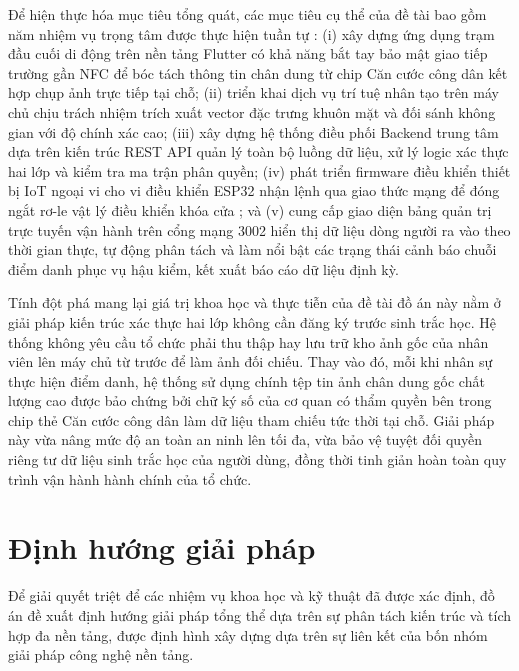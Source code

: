 \documentclass[../DoAn.tex]{subfiles}
\begin{document}
Để hiện thực hóa mục tiêu tổng quát, các mục tiêu cụ thể của đề tài bao gồm năm nhiệm vụ trọng tâm được thực hiện tuần tự : (i) xây dựng ứng dụng trạm đầu cuối di động trên nền tảng Flutter có khả năng bắt tay bảo mật giao tiếp trường gần NFC để bóc tách thông tin chân dung từ chip Căn cước công dân kết hợp chụp ảnh trực tiếp tại chỗ; (ii) triển khai dịch vụ trí tuệ nhân tạo trên máy chủ chịu trách nhiệm trích xuất vector đặc trưng khuôn mặt và đối sánh không gian với độ chính xác cao; (iii) xây dựng hệ thống điều phối Backend trung tâm dựa trên kiến trúc REST API quản lý toàn bộ luồng dữ liệu, xử lý logic xác thực hai lớp và kiểm tra ma trận phân quyền; (iv) phát triển firmware điều khiển thiết bị IoT ngoại vi cho vi điều khiển ESP32 nhận lệnh qua giao thức mạng để đóng ngắt rơ-le vật lý điều khiển khóa cửa ; và (v) cung cấp giao diện bảng quản trị trực tuyến vận hành trên cổng mạng 3002 hiển thị dữ liệu dòng người ra vào theo thời gian thực, tự động phân tách và làm nổi bật các trạng thái cảnh báo chuỗi điểm danh phục vụ hậu kiểm, kết xuất báo cáo dữ liệu định kỳ.

Tính đột phá mang lại giá trị khoa học và thực tiễn của đề tài đồ án này nằm ở giải pháp kiến trúc xác thực hai lớp không cần đăng ký trước sinh trắc học. Hệ thống không yêu cầu tổ chức phải thu thập hay lưu trữ kho ảnh gốc của nhân viên lên máy chủ từ trước để làm ảnh đối chiếu. Thay vào đó, mỗi khi nhân sự thực hiện điểm danh, hệ thống sử dụng chính tệp tin ảnh chân dung gốc chất lượng cao được bảo chứng bởi chữ ký số của cơ quan có thẩm quyền bên trong chip thẻ Căn cước công dân làm dữ liệu tham chiếu tức thời tại chỗ. Giải pháp này vừa nâng mức độ an toàn an ninh lên tối đa, vừa bảo vệ tuyệt đối quyền riêng tư dữ liệu sinh trắc học của người dùng, đồng thời tinh giản hoàn toàn quy trình vận hành hành chính của tổ chức.

\section{Định hướng giải pháp}
\label{section:1.3}

Để giải quyết triệt để các nhiệm vụ khoa học và kỹ thuật đã được xác định, đồ án đề xuất định hướng giải pháp tổng thể dựa trên sự phân tách kiến trúc và tích hợp đa nền tảng, được định hình xây dựng dựa trên sự liên kết của bốn nhóm giải pháp công nghệ nền tảng. 
\end{document}
